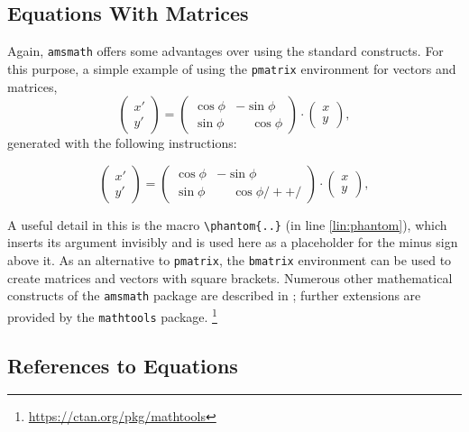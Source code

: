 \subsection{Equations With Matrices}

Again, \texttt{amsmath} offers some advantages over using the standard \latex
constructs. For this purpose, a simple example of using the \texttt{pmatrix}
environment for vectors and matrices,
%
\begin{equation}
	\begin{pmatrix}
		x' \\ y'
	\end{pmatrix}
	=
	\begin{pmatrix}
		\cos \phi & -\sin \phi           \\
		\sin \phi & \phantom{-}\cos \phi
	\end{pmatrix}
	\cdot
	\begin{pmatrix}
		x \\ y
	\end{pmatrix} ,
\end{equation}
%
generated with the following instructions:
%
\begin{LaTeXCode}
\begin{equation}
	\begin{pmatrix} 
			x' \\ 
			y' 
	\end{pmatrix}
	= 
	\begin{pmatrix}
		  \cos \phi &          -\sin \phi \\
		  \sin \phi & \phantom{-}\cos \phi /+ \label{lin:phantom} +/
	\end{pmatrix} 
	\cdot
	\begin{pmatrix} 
			x \\ 
			y 
	\end{pmatrix} ,
\end{equation}
\end{LaTeXCode}
%
A useful detail in this is the \tex macro \verb!\phantom{..}! (in line 
\ref{lin:phantom}), which inserts its argument invisibly and is used here
as a placeholder for the minus sign above it.
As an alternative to \texttt{pmatrix}, the \texttt{bmatrix} environment can
be used to create matrices and vectors with square brackets.
Numerous other mathematical constructs of the \texttt{amsmath} package are
described in \cite{Mittelbach2025}; further extensions are provided by the
\texttt{mathtools} package.%
\footnote{\url{https://ctan.org/pkg/mathtools}}


\subsection{References to Equations}
\label{sec:ReferencesToEquations}

